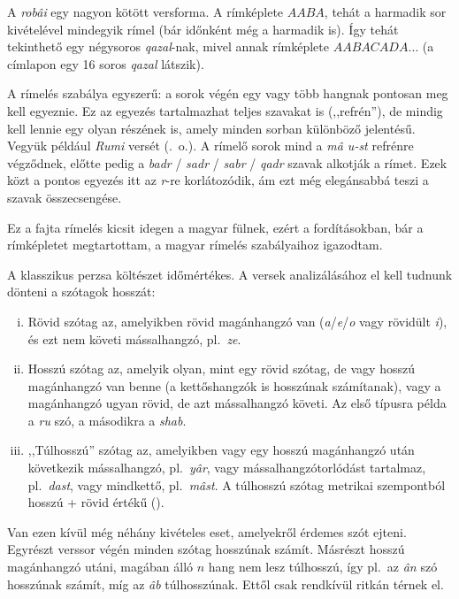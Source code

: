 A \emph{robâi} egy nagyon kötött versforma. A rímképlete $AABA$, tehát
a harmadik sor kivételével mindegyik rímel (bár időnként még a
harmadik is). Így tehát tekinthető egy négysoros \emph{qazal}-nak,
mivel annak rímképlete $AABACADA\dots$ (a címlapon egy 16 soros
\emph{qazal} látszik).

A rímelés szabálya egyszerű: a sorok végén egy vagy több hangnak
pontosan meg kell egyeznie. Ez az egyezés tartalmazhat teljes szavakat
is (,,refrén''), de mindig kell lennie egy olyan részének is, amely
minden sorban különböző jelentésű. Vegyük például \emph{Rumi} versét
(\pageref{Rumi}.~o.). A rímelő sorok mind a \emph{mâ u-st} refrénre
végződnek, előtte pedig a
\emph{badr} / \emph{sadr} / \emph{sabr} / \emph{qadr} szavak alkotják a
rímet. Ezek közt a pontos egyezés itt az \emph{r}-re korlátozódik, ám
ezt még elegánsabbá teszi a szavak összecsengése.

Ez a fajta rímelés kicsit idegen a magyar fülnek, ezért a
fordításokban, bár a rímképletet megtartottam, a magyar rímelés
szabályaihoz igazodtam.

A klasszikus perzsa költészet időmértékes. A versek analizálásához
el kell tudnunk dönteni a szótagok hosszát:

\begin{enumerate}[i)]
  \item Rövid szótag az, amelyikben rövid magánhangzó van
    (\emph{a}/\emph{e}/\emph{o} vagy rövidült \emph{i}), és ezt nem
    követi mássalhangzó, pl.~\emph{ze}.
  \item Hosszú szótag az, amelyik olyan, mint egy rövid szótag, de
    vagy hosszú magánhangzó van benne (a kettőshangzók is hosszúnak
    számítanak), vagy a magánhangzó ugyan rövid, de azt mássalhangzó
    követi. Az első típusra példa a \emph{ru} szó, a másodikra a
    \emph{shab}.
  \item ,,Túlhosszú'' szótag az, amelyikben vagy egy hosszú magánhangzó
    után következik mássalhangzó, pl.~\emph{yâr}, vagy
    mássalhangzótorlódást tartalmaz, pl.~\emph{dast}, vagy mindkettő,
    pl.~\emph{mâst}. A túlhosszú szótag metrikai szempontból hosszú +
    rövid értékű (\metra{\m\b}).
\end{enumerate}

Van ezen kívül még néhány kivételes eset, amelyekről érdemes szót ejteni.
Egyrészt verssor végén minden szótag hosszúnak számít.
Másrészt hosszú magánhangzó utáni, magában álló $n$ hang
nem lesz túlhosszú, így pl.~az \emph{ân} szó hosszúnak számít, míg
az \emph{âb} túlhosszúnak. Ettől csak rendkívül ritkán térnek el.

